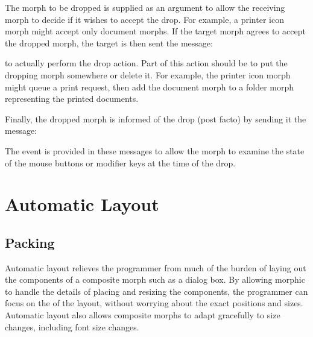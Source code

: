 \documentclass[letterpaper,10pt,english]{sphinxmanual}
\begin{document}
\begin{sphinxVerbatim}[commandchars=\\\{\}]
   
\end{sphinxVerbatim}

The morph to be dropped is supplied as an argument to allow the receiving morph to decide if it wishes to accept the drop. For example, a printer icon morph might accept only document morphs. If the target morph agrees to accept the dropped morph, the target is then sent the message:

\begin{sphinxVerbatim}[commandchars=\\\{\}]
   
\end{sphinxVerbatim}

to actually perform the drop action. Part of this action should be to put the dropping morph somewhere or delete it. For example, the printer icon morph might queue a print request, then add the document morph to a folder morph representing the printed documents.

Finally, the dropped morph is informed of the drop (post facto) by sending it the message:

\begin{sphinxVerbatim}[commandchars=\\\{\}]
   
\end{sphinxVerbatim}

The event is provided in these messages to allow the morph to examine the state of the mouse buttons or modifier keys at the time of the drop.


\section{Automatic Layout}
\label{\detokenize{morphic:automatic-layout}}

\subsection{Packing}
\label{\detokenize{morphic:packing}}
Automatic layout relieves the programmer from much of the burden of laying out the components of a composite morph such as a dialog box. By allowing morphic to handle the details of placing and resizing the components, the programmer can focus on the  of the layout, without worrying about the exact positions and sizes. Automatic layout also allows composite morphs to adapt gracefully to size changes, including font size changes.
\end{document}

